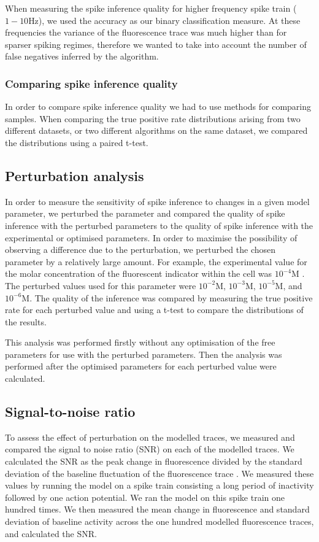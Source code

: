 \documentclass[a4paper,12pt]{article}
\theoremstyle{definition}
\begin{document}
When measuring the spike inference quality for higher frequency spike train ($1-10$Hz), we used the accuracy as our binary classification measure. At these frequencies the variance of the fluorescence trace was much higher than for sparser spiking regimes, therefore we wanted to take into account the number of false negatives inferred by the algorithm.

\subsubsection{Comparing spike inference quality}
In order to compare spike inference quality we had to use methods for comparing samples. When comparing the true positive rate distributions arising from two different datasets, or two different algorithms on the same dataset, we compared the distributions using a paired t-test. %

\subsection{Perturbation analysis}
In order to measure the sensitivity of spike inference to changes in a given model parameter, we perturbed the parameter and compared the quality of spike inference with the perturbed parameters to the quality of spike inference with the experimental or optimised parameters. In order to maximise the possibility of observing a difference due to the perturbation, we perturbed the chosen parameter by a relatively large amount. For example, the experimental value for the molar concentration of the fluorescent indicator within the cell was $10^{−4}$M \cite{maravall}. The perturbed values used for this parameter were $10^{−2}$M, $10^{−3}$M, $10^{−5}$M, and $10^{−6}$M. The quality of the inference was compared by measuring the true positive rate for each perturbed value and using a t-test to compare the distributions of the results.

This analysis was performed firstly without any optimisation of the free parameters for use with the perturbed parameters. Then the analysis was performed after the optimised parameters for each perturbed value were calculated.

\subsection{Signal-to-noise ratio}\label{sec:snr}
To assess the effect of perturbation on the modelled traces, we measured and compared the signal to noise ratio (SNR) on each of the modelled traces. We calculated the SNR as the peak change in fluorescence divided by the standard deviation of the baseline fluctuation of the fluorescence trace \cite{tada}. We measured these values by running the model on a spike train consisting a long period of inactivity followed by one action potential. We ran the model on this spike train one hundred times. We then measured the mean change in fluorescence and standard deviation of baseline activity across the one hundred modelled fluorescence traces, and calculated the SNR.
\end{document}
